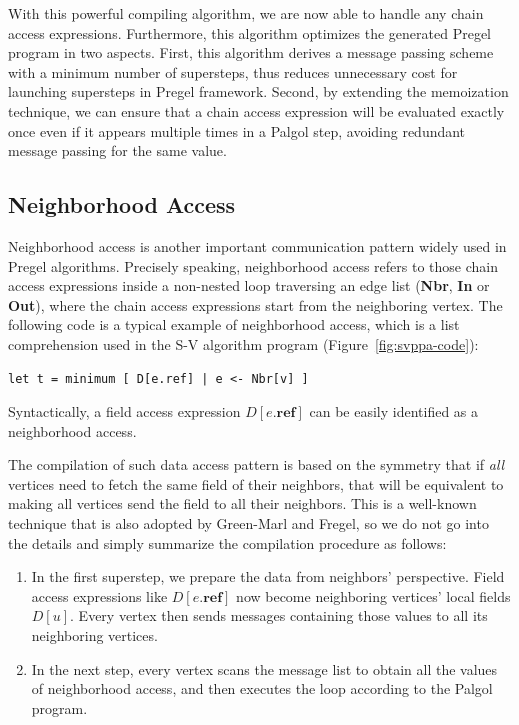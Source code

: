 \documentclass{sokendai_thesis} %
\begin{document}
With this powerful compiling algorithm, we are now able to handle any chain access expressions.
Furthermore, this algorithm optimizes the generated Pregel program in two aspects.
First, this algorithm derives a message passing scheme with a minimum number of supersteps, thus reduces unnecessary cost for launching supersteps in Pregel framework.
Second, by extending the memoization technique, we can ensure that a chain access expression will be evaluated exactly once even if it appears multiple times in a Palgol step, avoiding redundant message passing for the same value.


\subsection{Neighborhood Access}
\label{sec:neighboring-access}

Neighborhood access is another important communication pattern widely used in Pregel algorithms.
Precisely speaking, neighborhood access refers to those chain access expressions inside a non-nested loop traversing an edge list (\textbf{Nbr}, \textbf{In} or \textbf{Out}), where the chain access expressions start from the neighboring vertex.
The following code is a typical example of neighborhood access, which is a list comprehension used in the S-V algorithm program (Figure~\ref{fig:svppa-code}):
\begin{lstlisting}[basicstyle=\small\ttfamily,firstnumber=7]
    let t = minimum [ D[e.ref] | e <- Nbr[v] ]
\end{lstlisting}
Syntactically, a field access expression $D[e.\mathbf{ref}]$ can be easily identified as a neighborhood access.

The compilation of such data access pattern is based on the symmetry that if \emph{all} vertices need to fetch the same field of their neighbors, that will be equivalent to making all vertices send the field to all their neighbors.
This is a well-known technique that is also adopted by Green-Marl and Fregel, so we do not go into the details and simply summarize the compilation procedure as follows:
\begin{enumerate}
 \item In the first superstep, we prepare the data from neighbors' perspective.
  Field access expressions like $D[e.\mathbf{ref}]$ now become neighboring vertices' local fields $D[u]$.
  Every vertex then sends messages containing those values to all its neighboring vertices.
 \item In the next step, every vertex scans the message list to obtain all the values of neighborhood access, and then executes the loop according to the Palgol program.
\end{enumerate}
\end{document}
